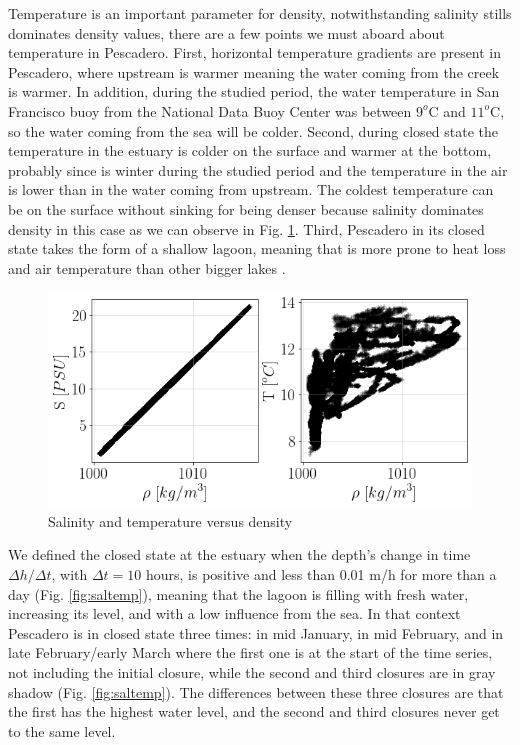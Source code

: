 \documentclass[tesis.tex]{subfiles}
\begin{document}
Temperature is an important parameter for density, notwithstanding salinity stills dominates density values, there are a few points we must aboard about temperature in Pescadero. First, horizontal temperature gradients are present in Pescadero, where upstream is warmer meaning the water coming from the creek is warmer. In addition, during the studied period, the water temperature in San Francisco buoy from the National Data Buoy Center was between $9^o$C and $11^o$C, so the water coming from the sea will be colder. Second, during closed state the temperature in the estuary is colder on the surface and warmer at the bottom, probably since is winter during the studied period and the temperature in the air is lower than in the water coming from upstream. The coldest temperature can be on the surface without sinking for being denser because salinity dominates density in this case as we can observe in Fig. \ref{fig:saltdens}. Third, Pescadero in its closed state takes the form of a shallow lagoon, meaning that is more prone to heat loss and air temperature than other bigger lakes \citep{peeters2009currents}.\\

\begin{figure}[h!]
  \centering
  \includegraphics[scale=0.5]{Imagenes/salT_dens.png}
  \caption{Salinity and temperature versus density}
  \label{fig:saltdens}
\end{figure}

We defined the closed state at the estuary when the depth's change in time $\Delta h/\Delta t$, with $\Delta t=10$ hours, is positive and less than 0.01 m/h for more than a day (Fig. \ref{fig:saltemp}), meaning that the lagoon is filling with fresh water, increasing its level, and with a low influence from the sea. In that context Pescadero is in closed state three times: in mid January, in mid February, and in late February/early March where the first one is at the start of the time series, not including the initial closure, while the second and third closures are in gray shadow (Fig. \ref{fig:saltemp}). The differences between these three closures are that the first has the highest water level, and the second and third closures never get to the same level. \\
\end{document}
